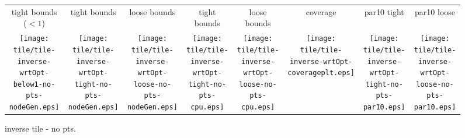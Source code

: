 \documentclass[a4paper,landscape]{article}
\begin{document}
\begin{figure}[t]
	\centering
    \begin{tabular}{c c c c c c c c}
	    tight bounds ($<1$) & tight bounds & loose bounds & tight bounds & loose bounds & coverage & par10 tight & par10 loose\\
	   \begin{minipage}{\cpufigureplotwidth}
      \texttt{[image: tile/tile-inverse-wrtOpt-below1-no-pts-nodeGen.eps]}
        \end{minipage}&
        \begin{minipage}{\cpufigureplotwidth}
        \texttt{[image: tile/tile-inverse-wrtOpt-tight-no-pts-nodeGen.eps]}
        \end{minipage}&
        \begin{minipage}{\cpufigureplotwidth}
      \texttt{[image: tile/tile-inverse-wrtOpt-loose-no-pts-nodeGen.eps]}
      \end{minipage}&
        \begin{minipage}{\cpufigureplotwidth}
        \texttt{[image: tile/tile-inverse-wrtOpt-tight-no-pts-cpu.eps]}
        \end{minipage}&
        \begin{minipage}{\cpufigureplotwidth}
        \texttt{[image: tile/tile-inverse-wrtOpt-loose-no-pts-cpu.eps]}
        \end{minipage}&
        \begin{minipage}{\cpufigureplotwidth}
        \texttt{[image: tile/tile-inverse-wrtOpt-coverageplt.eps]}
        \end{minipage}&
        \begin{minipage}{\cpufigureplotwidth}
        \texttt{[image: tile/tile-inverse-wrtOpt-tight-no-pts-par10.eps]}
        \end{minipage}&
        \begin{minipage}{\cpufigureplotwidth}
        \texttt{[image: tile/tile-inverse-wrtOpt-loose-no-pts-par10.eps]}
        \end{minipage}
	\end{tabular}
\caption{inverse tile - no pts.}
\label{fig:tile-inverse-no-pts}
\end{figure}
\end{document}
